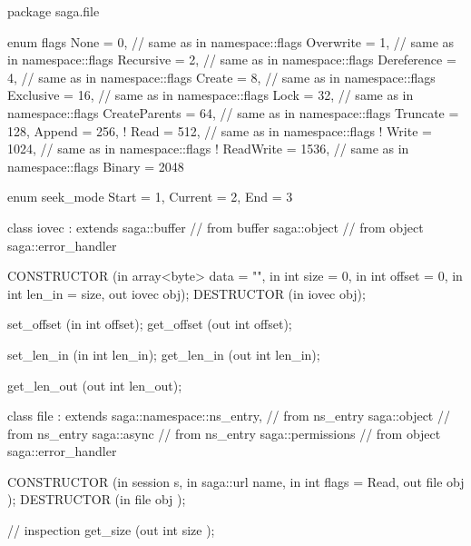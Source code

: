  \begin{myspec}
  package saga.file 
  { 
    enum flags 
    { 
      None           =    0, // same as in namespace::flags 
      Overwrite      =    1, // same as in namespace::flags
      Recursive      =    2, // same as in namespace::flags 
      Dereference    =    4, // same as in namespace::flags 
      Create         =    8, // same as in namespace::flags 
      Exclusive      =   16, // same as in namespace::flags
      Lock           =   32, // same as in namespace::flags 
      CreateParents  =   64, // same as in namespace::flags 
      Truncate       =  128, 
      Append         =  256, 
!     Read           =  512, // same as in namespace::flags 
!     Write          = 1024, // same as in namespace::flags 
!     ReadWrite      = 1536, // same as in namespace::flags 
      Binary         = 2048 
    }
 
 
    enum seek_mode
    {
      Start      =   1,
      Current    =   2,
      End        =   3
    }
 
 
    class iovec : extends saga::buffer
               // from buffer saga::object
               // from object saga::error_handler
    {
      CONSTRUCTOR (in array<byte>          data   = "",
                   in    int               size   = 0,
                   in    int               offset = 0,
                   in    int               len_in = size,
                   out   iovec             obj);
      DESTRUCTOR  (in    iovec             obj);
 
      set_offset  (in    int               offset);
      get_offset  (out   int               offset);
 
      set_len_in  (in    int               len_in);
      get_len_in  (out   int               len_in);
 
      get_len_out (out   int               len_out);
    }
 
    class file : extends        saga::namespace::ns_entry,
              // from ns_entry  saga::object
              // from ns_entry  saga::async
              // from ns_entry  saga::permissions
              // from object    saga::error_handler
    {
      CONSTRUCTOR (in    session           s,
                   in    saga::url         name,
                   in    int               flags = Read,
                   out   file              obj      );
      DESTRUCTOR  (in    file              obj      );
 
      // inspection
      get_size    (out   int               size     );
 
}}
\end{myspec}
